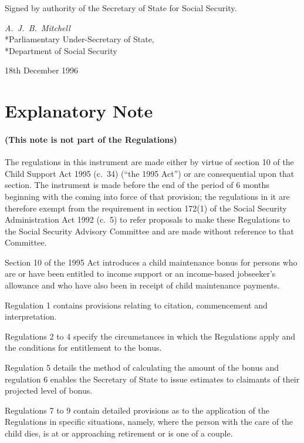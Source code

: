 \documentclass[a4paper]{article}
\newcommand{\parthead}{}
\begin{document}
\bigskip

Signed by authority of the Secretary of State for Social Security.

{\raggedleft
\emph{A.\ J.\ B.\ Mitchell}\\*Parliamentary Under-Secretary of
State,\\*Department of Social Security

}

18th December 1996

\part{Explanatory Note}

\renewcommand\parthead{--- Explanatory Note}

\subsection*{(This note is not part of the Regulations)}

The regulations in this instrument are made either by virtue of section 10 of the Child Support Act 1995 (c.\ 34) (“the 1995 Act”) or are consequential upon that section. The instrument is made before the end of the period of 6 months beginning with the coming into force of that provision; the regulations in it are therefore exempt from the requirement in section 172(1) of the Social Security Administration Act 1992 (c.\ 5) to refer proposals to make these Regulations to the Social Security Advisory Committee and are made without reference to that Committee.

  Section 10 of the 1995 Act introduces a child maintenance bonus for persons who are or have been entitled to income support or an income-based jobseeker’s allowance and who have also been in receipt of child maintenance payments.

  Regulation 1 contains provisions relating to citation, commencement and interpretation.

  Regulations 2 to 4 specify the circumstances in which the Regulations apply and the conditions for entitlement to the bonus.

  Regulation 5 details the method of calculating the amount of the bonus and regulation 6 enables the Secretary of State to issue estimates to claimants of their projected level of bonus.

  Regulations 7 to 9 contain detailed provisions as to the application of the Regulations in specific situations, namely, where the person with the care of the child dies, is at or approaching retirement or is one of a couple.
\end{document}
